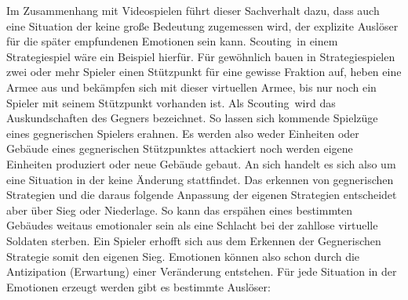 Im Zusammenhang mit Videospielen führt dieser Sachverhalt dazu, dass auch eine Situation der keine große Bedeutung zugemessen wird, der explizite Auslöser für die später empfundenen Emotionen sein kann. \glqq Scouting\grqq\ in einem Strategiespiel wäre ein Beispiel hierfür. Für gewöhnlich bauen in Strategiespielen zwei oder mehr Spieler einen Stützpunkt für eine gewisse Fraktion auf, heben eine Armee aus und bekämpfen sich mit dieser virtuellen Armee, bis nur noch ein Spieler mit seinem Stützpunkt vorhanden ist. Als \glqq Scouting\grqq\ wird das Auskundschaften des Gegners bezeichnet. So lassen sich kommende Spielzüge eines gegnerischen Spielers erahnen. Es werden also weder Einheiten oder Gebäude eines gegnerischen Stützpunktes attackiert noch werden eigene Einheiten produziert oder neue Gebäude gebaut. An sich handelt es sich also um eine Situation in der keine Änderung stattfindet. 
Das erkennen von gegnerischen Strategien und die daraus folgende Anpassung der eigenen Strategien entscheidet aber über Sieg oder Niederlage. So kann das erspähen eines bestimmten Gebäudes weitaus emotionaler sein als eine Schlacht bei der zahllose virtuelle Soldaten sterben. Ein Spieler erhofft sich aus dem Erkennen der Gegnerischen Strategie somit den eigenen Sieg. Emotionen können also schon durch die Antizipation (Erwartung) einer Veränderung entstehen. Für jede Situation in der Emotionen erzeugt werden gibt es bestimmte Auslöser:  \cite[S. 11 ff.]{Adams:1515529}
